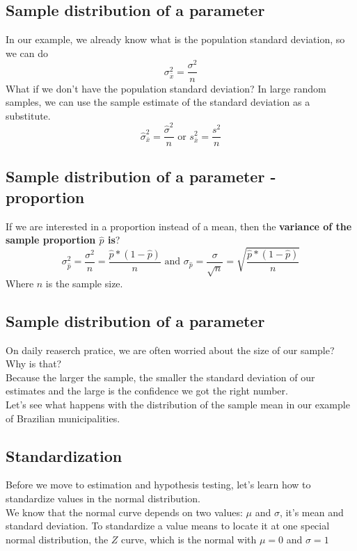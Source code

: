 \documentclass[11pt]{article}
\begin{document}
	\subsection*{Sample distribution of a parameter}
In our example, we already know what is the population standard deviation, so we can do
\[\sigma_{\bar{x}}^2 = \frac{\sigma^2}{n}\]
What if we don't have the population standard deviation? In large random samples, we can use the sample estimate of the standard deviation as a substitute.
\[\hat{\sigma}_{\bar{x}}^2 = \frac{\hat{\sigma}^2}{n} \text{  or  } s_{\bar{x}}^2 = \frac{s^2}{n}\]

	\subsection*{Sample distribution of a parameter - proportion}
	If we are interested in a proportion instead of a mean, then the \textbf{variance of the sample proportion $\hat{p}$ is}?
\[\sigma_{\hat{p}}^2 = \frac{\sigma^2}{n} = \frac{\hat{p} * (1-\hat{p})}{n} \text{ and }\sigma_{\hat{p}} = \frac{\sigma}{\sqrt{n}} = \sqrt{\frac{\hat{p} * (1-\hat{p})}{n}}\]
Where $n$ is the sample size.


	\subsection*{Sample distribution of a parameter}
	On daily reaserch pratice, we are often worried about the size of our sample? Why is that?
	\newline\\
	Because the larger the sample, the smaller the standard deviation of our estimates and the large is the confidence we got the right number.
	\newline\\
	Let's see what happens with the distribution of the sample mean in our example of Brazilian municipalities.



	\subsection*{Standardization}
	Before we move to estimation and hypothesis testing, let's learn how to standardize values in the normal distribution.
	\newline\\
	We know that the normal curve depends on two values: $\mu$ and $\sigma$, it's mean and standard deviation. To standardize a value means to locate it at one special normal distribution, the $Z$ curve, which is the normal with $\mu =0 $ and $\sigma =1$
\end{document}

